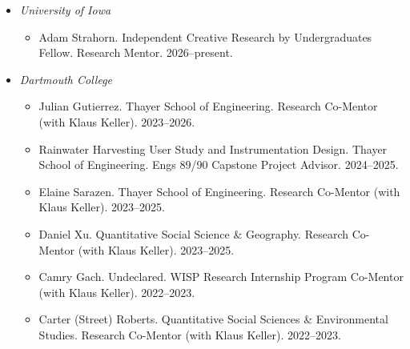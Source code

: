 \documentclass[10pt,oneside]{article}
\begin{document}
\begin{itemize}[label={}, leftmargin=1.5em, nosep, noitemsep]



  \item \textit{University of Iowa}

  \begin{itemize}[label={}, leftmargin=1.5em, nosep, noitemsep]

    

      
      \item Adam Strahorn. Independent Creative Research by Undergraduates Fellow. Research Mentor. 2026--present.  
      

    

  \end{itemize}



  \item \textit{Dartmouth College}

  \begin{itemize}[label={}, leftmargin=1.5em, nosep, noitemsep]

    

      
      \item Julian Gutierrez. Thayer School of Engineering. Research Co-Mentor (with Klaus Keller). 2023--2026.  
      
      \item Rainwater Harvesting User Study and Instrumentation Design. Thayer School of Engineering. Engs 89/90 Capstone Project Advisor. 2024--2025.  
      
      \item Elaine Sarazen. Thayer School of Engineering. Research Co-Mentor (with Klaus Keller). 2023--2025.  
      
      \item Daniel Xu. Quantitative Social Science \& Geography. Research Co-Mentor (with Klaus Keller). 2023--2025.  
      
      \item Camry Gach. Undeclared. WISP Research Internship Program Co-Mentor (with Klaus Keller). 2022--2023.  
      
      \item Carter (Street) Roberts. Quantitative Social Sciences \& Environmental Studies. Research Co-Mentor (with Klaus Keller). 2022--2023.  
      

    

  \end{itemize}



\end{itemize}
\end{document}
